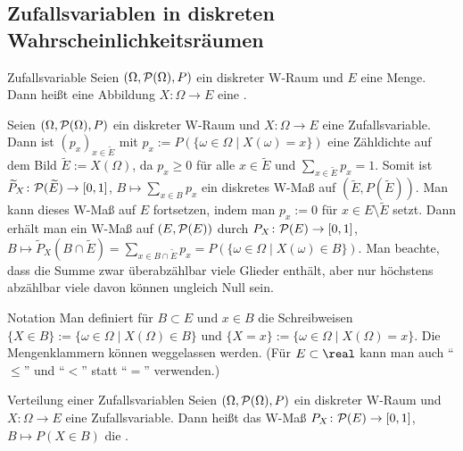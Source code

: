 \subsection{%
    Zufallsvariablen in diskreten Wahrscheinlichkeitsräumen%
}

\begin{Def}{Zufallsvariable}
    Seien $(\Omega, \P(\Omega), P)$ ein diskreter W-Raum und $E$ eine Menge.\\
    Dann heißt eine Abbildung $X\colon \Omega \rightarrow E$ eine
    .
\end{Def}

\begin{Bem}
    Seien $(\Omega, \P(\Omega), P)$ ein diskreter W-Raum und $X\colon \Omega \rightarrow E$
    eine Zufallsvariable.
    Dann ist $(p_x)_{x \in \widetilde{E}}$ mit
    $p_x := P(\{\omega \in \Omega \;|\; X(\omega) = x\})$
    eine Zähldichte auf dem Bild $\widetilde{E} := X(\Omega)$,
    da $p_x \ge 0$ für alle $x \in \widetilde{E}$ und $\sum_{x \in \widetilde{E}} p_x = 1$.
    Somit ist $\widetilde{P}_X\colon \P(\widetilde{E}) \rightarrow [0, 1]$,
    $B \mapsto \sum_{x \in B} p_x$ ein diskretes W-Maß auf $(\widetilde{E}, P(\widetilde{E}))$.
    Man kann dieses W-Maß auf $E$ fortsetzen, indem man $p_x := 0$ für
    $x \in E \setminus \widetilde{E}$ setzt.
    Dann erhält man ein W-Maß auf $(E, \P(E))$ durch
    $P_X\colon \P(E) \rightarrow [0, 1]$, $B \mapsto \widetilde{P}_X(B \cap \widetilde{E})
    = \sum_{x \in B \cap \widetilde{E}} p_x = P(\{\omega \in \Omega \;|\; X(\omega) \in B\})$.
    Man beachte, dass die Summe zwar überabzählbar viele Glieder enthält, aber nur
    höchstens abzählbar viele davon können ungleich Null sein.
\end{Bem}

\begin{Def}{Notation}
    Man definiert für $B \subset E$ und $x \in B$ die Schreibweisen\\
    $\{X \in B\} := \{\omega \in \Omega \;|\; X(\Omega) \in B\}$ und
    $\{X = x\} := \{\omega \in \Omega \;|\; X(\Omega) = x\}$.
    Die Mengenklammern können weggelassen werden.
    (Für $E \subset \real$ kann man auch "`$\le$"' und "`$<$"' statt "`$=$"' verwenden.)
\end{Def}

\begin{Def}{Verteilung einer Zufallsvariablen}
    Seien $(\Omega, \P(\Omega), P)$ ein diskreter W-Raum und\\
    $X\colon \Omega \rightarrow E$ eine Zufallsvariable.
    Dann heißt das W-Maß $P_X\colon \P(E) \rightarrow [0, 1]$, $B \mapsto P(X \in B)$
    die .
\end{Def}

